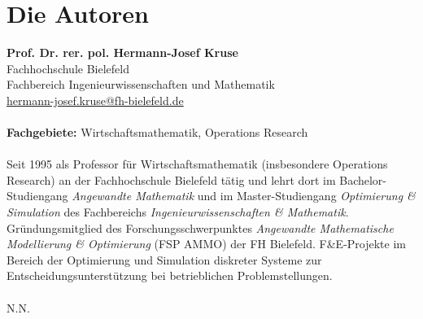 \chapter*{Die Autoren}
	 \cehead{}\rehead{}
	\lohead{}\cohead{}

\noindent\textbf{Prof. Dr. rer. pol. Hermann-Josef Kruse}\\
Fachhochschule Bielefeld\\
Fachbereich Ingenieurwissenschaften und Mathematik\\
\href{mailto:hermann-josef.kruse@fh-bielefeld.de}{hermann-josef.kruse@fh-bielefeld.de}
\\ \\
\textbf{Fachgebiete:} Wirtschaftsmathematik, Operations Research
\\ \\
Seit 1995 als Professor für Wirtschaftsmathematik (insbesondere Operations Research) an der Fachhochschule Bielefeld tätig und lehrt dort im Bachelor-Studiengang \textit{Angewandte Mathematik} und im Master-Studiengang \textit{Optimierung \& Simulation} des Fachbereichs \textit{Ingenieurwissenschaften \& Mathematik}. Gründungsmitglied des Forschungsschwerpunktes \textit{Angewandte Mathematische Modellierung \& Optimierung} (FSP AMMO) der FH Bielefeld. F\&E-Projekte im Bereich der Optimierung und Simulation diskreter Systeme zur Entscheidungsunterstützung bei betrieblichen Problemstellungen.
\\ \\
N.N.



